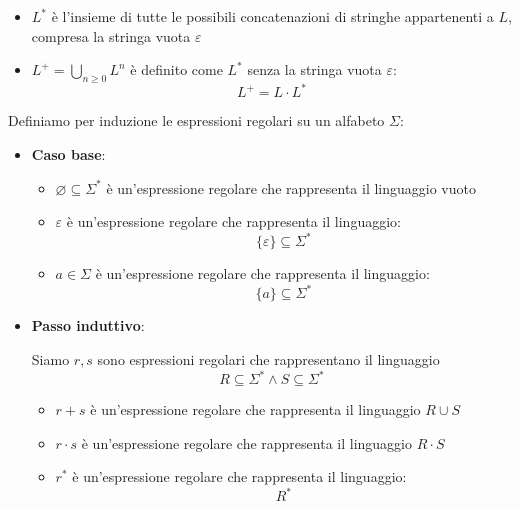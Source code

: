 \documentclass[a4paper]{article}
\begin{document}
\begin{itemize}
    \vspace{1em}
    \noindent
    \begin{itemize}
      \item \( L^* \) è l'insieme di tutte le possibili concatenazioni di stringhe
        appartenenti a \( L \), compresa la stringa vuota \( \varepsilon \)
      \item \( L^+ = \bigcup_{n \ge 0} L^n \) è definito come \( L^* \) senza la
        stringa vuota \( \varepsilon \):
        \[
          L^+ = L \cdot L^* 
        \]
    \end{itemize}
\end{itemize}

\begin{definition}
  Definiamo per induzione le espressioni regolari su un alfabeto \( \Sigma \):
  \begin{itemize}
    \item \textbf{Caso base}:
      \begin{itemize}
        \item \( \varnothing \subseteq \Sigma^* \) è un'espressione regolare che rappresenta
          il linguaggio vuoto

        \item \( \varepsilon \) è un'espressione regolare che rappresenta il linguaggio:
          \[
            \{\varepsilon\} \subseteq \Sigma^*
          \] 

        \item \( a \in \Sigma  \) è un'espressione regolare che rappresenta il linguaggio:
          \[
            \{a\} \subseteq \Sigma^*
          \]
      \end{itemize}

    \item \textbf{Passo induttivo}:

      \vspace{1em}
      \noindent
      Siamo \( r, s \) sono espressioni regolari che rappresentano il linguaggio
      \[
        R \subseteq \Sigma^* \wedge S \subseteq \Sigma^*
      \] 
      \begin{itemize}
        \item \( r + s \) è un'espressione regolare che rappresenta il linguaggio \( R \cup S \) 
        \item \( r \cdot s \) è un'espressione regolare che rappresenta il linguaggio \( R \cdot S \)
        \item \( r^* \) è un'espressione regolare che rappresenta il linguaggio:
          \[
            R^*
          \]
      \end{itemize}
  \end{itemize}
\end{definition}
\end{document}
